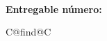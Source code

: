 \begin{center}
  \begin{spacing}{2.5}
    \textbf{\Huge \DelTitle}\\\vspace{10mm}
    \textbf{\Large Entregable número: \DelNumber} \\\vspace{10mm}
  \end{spacing}


  \newcommand\undefcolumntype[1]{\expandafter\let\csname NC@find@#1\endcsname\relax}
  \newcommand\forcenewcolumntype[1]{\undefcolumntype{#1}\newcolumntype{#1}}
  \forcenewcolumntype{C}{ >{\arraybackslash} m{3cm} }


\end{center}

\clearpage

\setlength{\headheight}{0.7cm}
\setlength{\footskip}{18mm}
\addtolength{\textheight}{-\footskip}
\pagestyle{empty}

